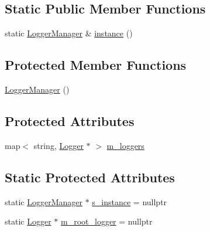 \subsection*{Static Public Member Functions}
\begin{DoxyCompactItemize}
\item 
static \hyperlink{classez_1_1logging_1_1LoggerManager}{Logger\+Manager} \& \hyperlink{classez_1_1logging_1_1LoggerManager_a787219c6e31bc575de95127350da7c5a}{instance} ()
\end{DoxyCompactItemize}
\subsection*{Protected Member Functions}
\begin{DoxyCompactItemize}
\item 
\hyperlink{classez_1_1logging_1_1LoggerManager_a76aa9e2191e3120990a550e064b2c691}{Logger\+Manager} ()
\end{DoxyCompactItemize}
\subsection*{Protected Attributes}
\begin{DoxyCompactItemize}
\item 
map$<$ string, \hyperlink{classez_1_1logging_1_1Logger}{Logger} $\ast$ $>$ \hyperlink{classez_1_1logging_1_1LoggerManager_a8c68f8c359e7a32438c9da137aa8b9bc}{m\+\_\+loggers}
\end{DoxyCompactItemize}
\subsection*{Static Protected Attributes}
\begin{DoxyCompactItemize}
\item 
static \hyperlink{classez_1_1logging_1_1LoggerManager}{Logger\+Manager} $\ast$ \hyperlink{classez_1_1logging_1_1LoggerManager_a635ac579d7e6e68fb248566e34d8485d}{s\+\_\+instance} = nullptr
\item 
static \hyperlink{classez_1_1logging_1_1Logger}{Logger} $\ast$ \hyperlink{classez_1_1logging_1_1LoggerManager_ac4e86e0e638673338ccb8d652446be92}{m\+\_\+root\+\_\+logger} = nullptr
\end{DoxyCompactItemize}


